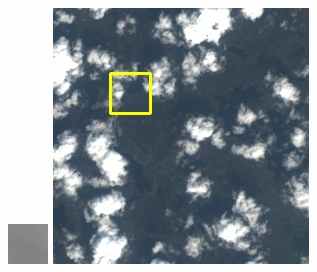 \documentclass[UTF8]{ctexart}
\begin{document}
\begin{figure}[H]
{\begin{minipage}[b]{0.15\linewidth}
            \includegraphics[width=1\linewidth]{../log/spoon2/cut/tmp_cut_LC81321192014054LGN00_03055_color.jpg}\vspace{4pt}
            \includegraphics[width=1\linewidth]{../log/spoon2/cut/LC80350192014190LGN00_06561_color.jpg}\vspace{4pt}

\end{minipage}}
\end{figure}
\end{document}
